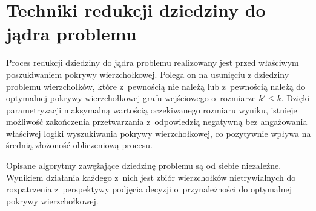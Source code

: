 \section{Techniki redukcji dziedziny do jądra problemu}\label{s_kernelization}

Proces redukcji dziedziny do jądra problemu realizowany jest przed właściwym 
poszukiwaniem pokrywy wierzchołkowej. 
Polega on na usunięciu z dziedziny problemu wierzchołków, które z~pewnością nie 
należą lub z~pewnością należą do optymalnej pokrywy wierzchołkowej grafu 
wejściowego o~rozmiarze $k\prime \leq k$.
Dzięki parametryzacji maksymalną wartością oczekiwanego rozmiaru wyniku,
istnieje możliwość zakończenia przetwarzania z~odpowiedzią negatywną bez
angażowania właściwej logiki wyszukiwania pokrywy wierzchołkowej, co pozytywnie
wpływa na średnią złożoność obliczeniową procesu.

Opisane algorytmy zawężające dziedzinę problemu są od siebie niezależne.
Wynikiem działania każdego z~nich jest zbiór wierzchołków nietrywialnych do
rozpatrzenia z~perspektywy podjęcia decyzji o~przynależności do optymalnej
pokrywy wierzchołkowej.






